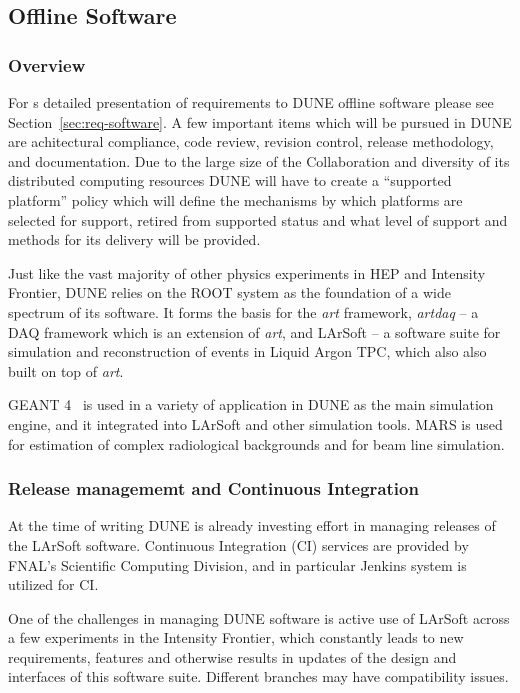\subsection{Offline Software}
\subsubsection{Overview}

For s detailed presentation of requirements to DUNE offline software please see Section~\ref{sec:req-software}.
A few important items which will be pursued in DUNE are achitectural compliance, code review, revision control, release methodology,
 and documentation. Due to the large size of the Collaboration and diversity of its distributed
 computing resources DUNE will have to create a ``supported platform'' policy which will define the mechanisms by
which platforms are selected for support, retired from
supported status and what level of support and methods for its delivery will be provided.

Just like the vast majority of other physics experiments in HEP and Intensity Frontier, DUNE relies on the ROOT\cite{root}
system as the foundation of a wide spectrum of its software. It forms the basis for the \textit{art} framework\cite{art},
\textit{artdaq} -- a DAQ framework which is an extension of \textit{art},
and LArSoft -- a software suite for simulation and reconstruction of
events in Liquid Argon TPC, which also also built on top of \textit{art}.

GEANT 4~\cite{geant4} is used in a variety of application in DUNE as the main simulation engine, and it integrated
into LArSoft and other simulation tools. MARS is used for estimation of complex radiological backgrounds and for
beam line simulation.

\subsubsection{Release managememt and Continuous Integration}
At the time of writing DUNE is already investing effort in managing releases of the LArSoft software.
Continuous Integration (CI) services are provided
by FNAL's Scientific Computing Division, and in particular Jenkins \cite{jenkins} system is utilized for CI.

One of the challenges in managing DUNE software is active use of LArSoft across a few experiments in the
Intensity Frontier, which constantly leads to new requirements, features and otherwise results in updates
of the design and interfaces of this software suite. Different branches may have compatibility issues.

